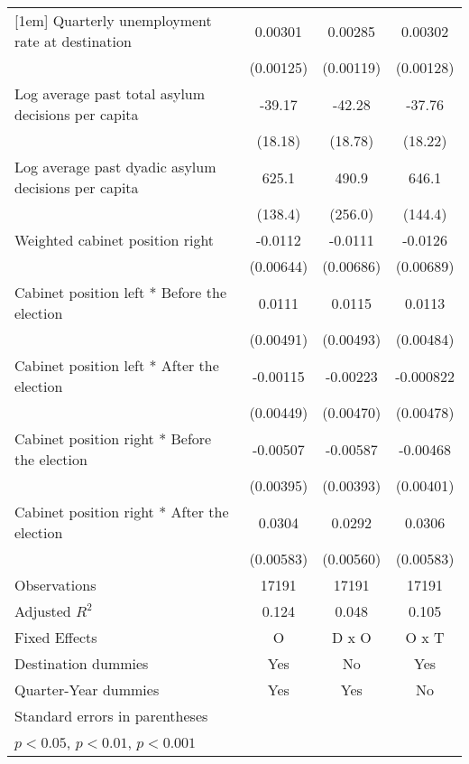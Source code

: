 \begin{table}[htbp]
\begin{tabular}{l*{3}{c}}
[1em]
Quarterly unemployment rate at destination&     0.00301\sym{*}  &     0.00285\sym{*}  &     0.00302\sym{*}  \\
                    &   (0.00125)         &   (0.00119)         &   (0.00128)         \\
[1em]
Log average past total asylum decisions per capita&      -39.17\sym{*}  &      -42.28\sym{*}  &      -37.76\sym{*}  \\
                    &     (18.18)         &     (18.78)         &     (18.22)         \\
[1em]
Log average past dyadic asylum decisions per capita&       625.1\sym{***}&       490.9         &       646.1\sym{***}\\
                    &     (138.4)         &     (256.0)         &     (144.4)         \\
[1em]
Weighted cabinet position right&     -0.0112         &     -0.0111         &     -0.0126         \\
                    &   (0.00644)         &   (0.00686)         &   (0.00689)         \\
[1em]
Cabinet position left * Before the election&      0.0111\sym{*}  &      0.0115\sym{*}  &      0.0113\sym{*}  \\
                    &   (0.00491)         &   (0.00493)         &   (0.00484)         \\
[1em]
Cabinet position left * After the election&    -0.00115         &    -0.00223         &   -0.000822         \\
                    &   (0.00449)         &   (0.00470)         &   (0.00478)         \\
[1em]
Cabinet position right * Before the election&    -0.00507         &    -0.00587         &    -0.00468         \\
                    &   (0.00395)         &   (0.00393)         &   (0.00401)         \\
[1em]
Cabinet position right * After the election&      0.0304\sym{***}&      0.0292\sym{***}&      0.0306\sym{***}\\
                    &   (0.00583)         &   (0.00560)         &   (0.00583)         \\
\hline
Observations        &       17191         &       17191         &       17191         \\
Adjusted \(R^{2}\)  &       0.124         &       0.048         &       0.105         \\
Fixed Effects       &           O         &       D x O         &       O x T         \\
Destination dummies &         Yes         &          No         &         Yes         \\
Quarter-Year dummies&         Yes         &         Yes         &          No         \\
\hline\hline
\multicolumn{4}{l}{\footnotesize Standard errors in parentheses}\\
\multicolumn{4}{l}{\footnotesize \sym{*} \(p<0.05\), \sym{**} \(p<0.01\), \sym{***} \(p<0.001\)}\\
\end{tabular}
\end{table}
